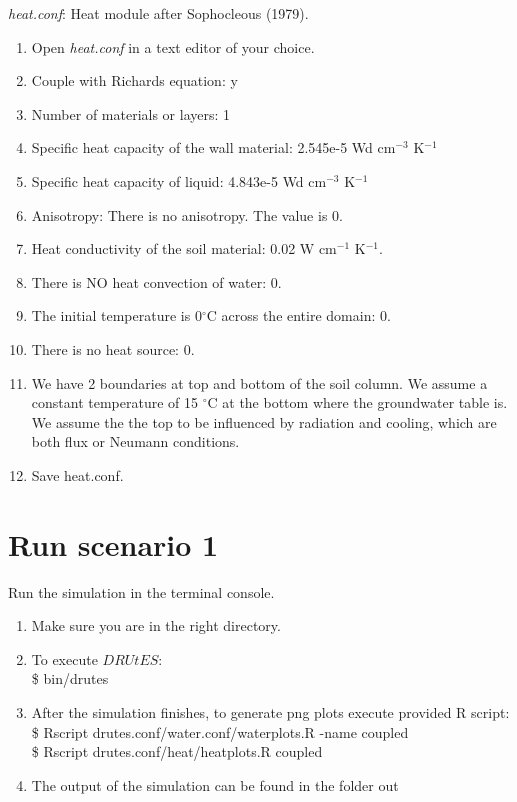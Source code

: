 \emph{heat.conf}: Heat module after Sophocleous (1979). 


\begin{enumerate}
\item Open \emph{heat.conf} in a text editor of your choice. 

\item Couple with Richards equation: y
\item Number of materials or layers: 1 
\item Specific heat capacity of the wall material:  2.545e-5 Wd cm$^{-3}$ K$^{-1}$ 
\item Specific heat capacity of liquid: 4.843e-5  Wd cm$^{-3}$ K$^{-1}$ 
\item Anisotropy: There is no anisotropy. The value is 0.
\item Heat conductivity of the soil material: 0.02 W cm$^{-1}$ K$^{-1}$. 
\item There is NO heat convection of water: 0.
\item The initial temperature is 0$^{\circ}$C across the entire domain: 0.
\item There is no heat source: 0. 
\item We have 2 boundaries at top and bottom of the soil column. We assume a constant temperature of 15 $^{\circ}$C at the bottom where the groundwater table is. We assume the the top to be influenced by radiation and cooling, which are both flux or Neumann conditions. \\

\item Save heat.conf.
\end{enumerate}

\section*{Run scenario 1}
Run the simulation in the terminal console.
\begin{enumerate}
\item Make sure you are in the right directory. 
\item To execute $DRUtES$: \\
\$ bin/drutes
\item After the simulation finishes, to generate png plots execute provided R script: \\
\$ Rscript drutes.conf/water.conf/waterplots.R -name coupled \\
\$ Rscript drutes.conf/heat/heatplots.R coupled
\item The output of the simulation can be found in the folder out
\end{enumerate}


